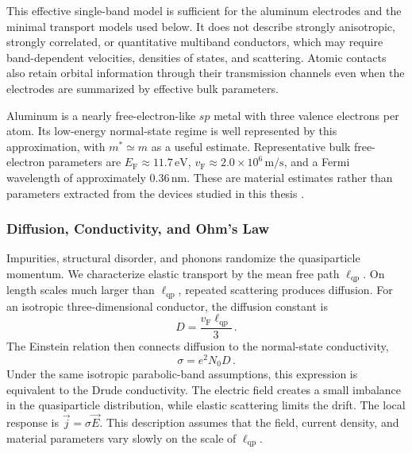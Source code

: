             This effective single-band model is sufficient for the aluminum electrodes and the minimal transport models used below. It does not describe strongly anisotropic, strongly correlated, or quantitative multiband conductors, which may require band-dependent velocities, densities of states, and scattering. Atomic contacts also retain orbital information through their transmission channels even when the electrodes are summarized by effective bulk parameters.

            Aluminum is a nearly free-electron-like $sp$ metal with three valence electrons per atom. Its low-energy normal-state regime is well represented by this approximation, with $m^\ast \simeq m$ as a useful estimate. Representative bulk free-electron parameters are $E_\mathrm{F}\approx11.7\,\mathrm{eV}$, $v_\mathrm{F}\approx2.0\times10^6\,\mathrm{m/s}$, and a Fermi wavelength of approximately $0.36\,\mathrm{nm}$. These are material estimates rather than parameters extracted from the devices studied in this thesis \cite{chauvin_josephson_2005,steinberg_quasi-particle_2008}.

        \subsubsection*{Diffusion, Conductivity, and Ohm's Law}

            Impurities, structural disorder, and phonons randomize the quasiparticle momentum. We characterize elastic transport by the mean free path $\ell_\mathrm{qp}$. On length scales much larger than $\ell_\mathrm{qp}$, repeated scattering produces diffusion. For an isotropic three-dimensional conductor, the diffusion constant is
            \begin{equation}
                D = \frac{v_\mathrm{F}\ell_\mathrm{qp}}{3}\,.
            \end{equation}
            The Einstein relation then connects diffusion to the normal-state conductivity,
            \begin{equation}
                \sigma = e^2 N_0 D\,.
            \end{equation}
            Under the same isotropic parabolic-band assumptions, this expression is equivalent to the Drude conductivity. The electric field creates a small imbalance in the quasiparticle distribution, while elastic scattering limits the drift. The local response is $\vec{j}=\sigma\vec{E}$. This description assumes that the field, current density, and material parameters vary slowly on the scale of $\ell_\mathrm{qp}$. \cite{drude_zur_1900,gross_festkorperphysik_2014}

